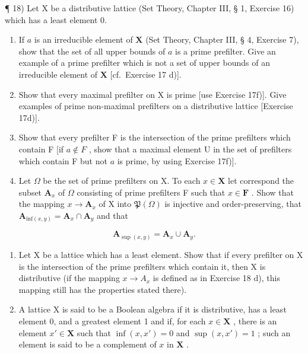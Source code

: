 ¶ 18) Let X be a distributive lattice (Set Theory, Chapter III, § 1, Exercise 16) which has a least element 0.

\begin{enumerate}
\def\labelenumi{\alph{enumi})}
\item
  If \(a\) is an irreducible element of \(\mathbf{X}\) (Set Theory, Chapter III, § 4, Exercise 7), show that the set of all upper bounds of \(a\) is a prime prefilter. Give an example of a prime prefilter which is not a set of upper bounds of an irreducible element of \(\mathbf{X}\) {[}cf.~Exercise 17 d){]}.
\item
  Show that every maximal prefilter on X is prime {[}use Exercise 17f){]}. Give examples of prime non-maximal prefilters on a distributive lattice {[}Exercise 17d){]}.
\item
  Show that every prefilter F is the intersection of the prime prefilters which contain F {[}if \(a \notin F\) , show that a maximal element U in the set of prefilters which contain F but not \(a\) is prime, by using Exercise 17f){]}.
\item
  Let \(\Omega\) be the set of prime prefilters on X. To each \(x \in \mathbf{X}\) let correspond the subset \(\mathbf{A}_x\) of \(\Omega\) consisting of prime prefilters F such that \(x \in \mathbf{F}\) . Show that the mapping \(x \to \mathbf{A}_x\) of X into \(\mathfrak{P}(\Omega)\) is injective and order-preserving, that \(\mathbf{A}_{\mathrm{inf}(x,y)} = \mathbf{A}_x \cap \mathbf{A}_y\) and that
\end{enumerate}

\[
\mathbf {A} _ {\sup (x, y)} = \mathbf {A} _ {x} \cup \mathbf {A} _ {y}.
\]

\begin{enumerate}
\def\labelenumi{\arabic{enumi})}
\setcounter{enumi}{18}
\item
  Let X be a lattice which has a least element. Show that if every prefilter on X is the intersection of the prime prefilters which contain it, then X is distributive (if the mapping \(x \rightarrow A_{x}\) is defined as in Exercise 18 d), this mapping still has the properties stated there).
\item
  A lattice X is said to be a Boolean algebra if it is distributive, has a least element 0, and a greatest element 1 and if, for each \(x \in \mathbf{X}\) , there is an element \(x' \in \mathbf{X}\) such that \(\inf (x, x') = 0\) and \(\sup (x, x') = 1\) ; such an element is said to be a complement of \(x\) in \(\mathbf{X}\) .
\end{enumerate}

